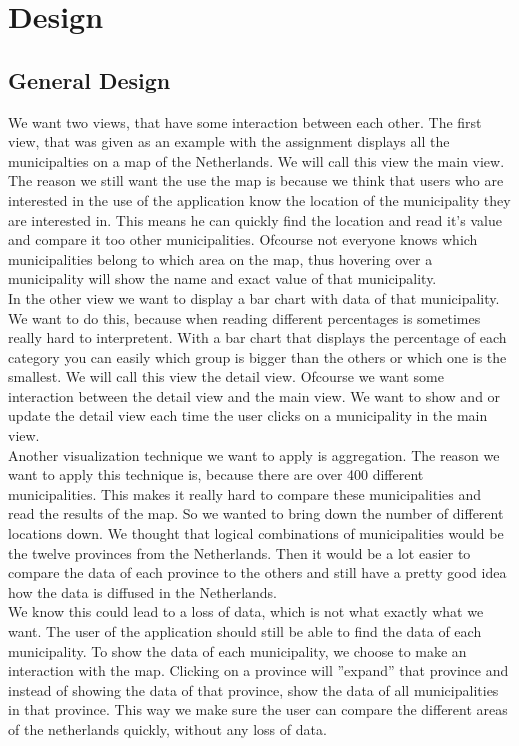 \section{Design}\label{sec:des}
\subsection{General Design}
We want two views, that have some interaction between each other. The first view, that was given as an example with the assignment displays all the municipalties on a map of the Netherlands. We will call this view the main view. The reason we still want the use the map is because we think that users who are interested in the use of the application know the location of the municipality they are interested in. This means he can quickly find the location and read it's value and compare it too other municipalities. Ofcourse not everyone knows which municipalities belong to which area on the map, thus hovering over a municipality will show the name and exact value of that municipality.\\
In the other view we want to display a bar chart with data of that municipality.  We want to do this, because when reading different percentages is sometimes really hard to interpretent. With a bar chart that displays the percentage of each category you can easily which group is bigger than the others or which one is the smallest. We will call this view the detail view. Ofcourse we want some interaction between the detail view and the main view. We want to show and or update the detail view each time the user clicks on a municipality in the main view. \\
Another visualization technique we want to apply is aggregation. The reason we want to apply this technique is, because there are over 400 different municipalities. This makes it really hard to compare these municipalities and read the results of the map. So we wanted to bring down the number of different locations down. We thought that logical combinations of municipalities would be the twelve provinces from the Netherlands. Then it would be a lot easier to compare the data of each province to the others and still have a pretty good idea how the data is diffused in the Netherlands. \\
We know this could lead to a loss of data, which is not what exactly what we want. The user of the application should still be able to find the data of each municipality. To show the data of each municipality, we choose to make an interaction with the map. Clicking on a province will ''expand'' that province and instead of showing the data of that province, show the data of all municipalities in that province. This way we make sure the user can compare the different areas of the netherlands quickly, without any loss of data. \\
